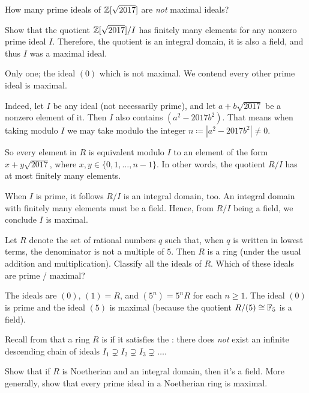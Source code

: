 \begin{dproblem}
	How many prime ideals of $\mathbb Z[\sqrt{2017}]$ are \emph{not} maximal ideals?
	\label{prob:dedekind_sample}
	\begin{hint}
		Show that the quotient $\mathbb Z[\sqrt{2017}]/I$ has finitely many elements
		for any nonzero prime ideal $I$.
		Therefore, the quotient is an integral domain, it is also a field,
		and thus $I$ was a maximal ideal.
	\end{hint}
	\begin{sol}
		Only one; the ideal $(0)$ which is not maximal.
		We contend every other prime ideal is maximal.

		Indeed, let $I$ be any ideal (not necessarily prime),
		and let $a + b \sqrt{2017}$ be a nonzero element of it.
		Then $I$ also contains $(a^2-2017b^2)$.
		That means when taking modulo $I$ we may take modulo the integer
		$n \coloneqq |a^2-2017b^2| \neq 0$.

		So every element in $R$ is equivalent modulo $I$
		to an element of the form $x + y \sqrt{2017}$,
		where $x,y \in \{0, 1, \dots, n-1\}$.
		In other words, the quotient $R/I$ has at most finitely many elements.

		When $I$ is prime, it follows $R/I$ is an integral domain, too.
		An integral domain with finitely many elements must be a field.
		Hence, from $R/I$ being a field, we conclude $I$ is maximal.
	\end{sol}
\end{dproblem}

\begin{problem}
	Let $R$ denote the set of rational numbers $q$ such that,
	when $q$ is written in lowest terms, the denominator is not a multiple of $5$.
	Then $R$ is a ring (under the usual addition and multiplication).
	Classify all the ideals of $R$.
	Which of these ideals are prime / maximal?
	\begin{sol}
		The ideals are $(0)$, $(1) = R$, and $(5^n) = 5^n R$ for each $n \ge 1$.
		The ideal $(0)$ is prime and the ideal $(5)$ is maximal
		(because the quotient $R/(5) \cong \mathbb F_5$ is a field).
	\end{sol}
\end{problem}

\begin{problem}
	Recall from  that a ring $R$ is 
	if it satisfies the :
	there does \emph{not} exist an infinite descending chain of ideals
	$I_1 \supsetneq I_2 \supsetneq I_3 \supsetneq \dots$.
	\begin{enumerate}[(a)]
		\ii Show that if $R$ is Noetherian and an integral domain, then it's a field.
		\ii More generally, show that every prime ideal in a Noetherian ring is maximal.
	\end{enumerate}
\end{problem}
